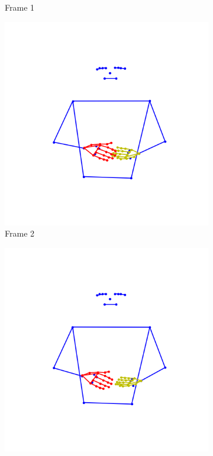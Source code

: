 \begin{figure}[t]
\begin{subfigure}[t]{0.3\textwidth}
		\caption{Frame 1 }
		\label{f:frame1}
	\end{subfigure}
	\begin{subfigure}[t]{0.3\textwidth}
	\centering
		\includegraphics[align=t,width=0.9\linewidth, height =0.9\linewidth]{Graphics/interpol_aborto_amar_2.png}
		\caption{Frame 2 }
		\label{f:frame2}
	\end{subfigure}
	\vskip 0pt
	\begin{subfigure}[t]{0.3\textwidth}
		\centering
		\includegraphics[align=t,width=0.9\linewidth, height =0.9\linewidth]{Graphics/interpol_aborto_amar_3.png}

\end{subfigure}
\end{figure}
